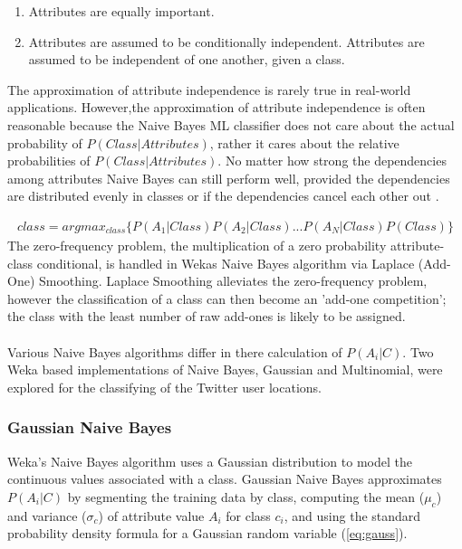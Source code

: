 \documentclass[11pt]{article}
\begin{document}
\begin{enumerate}
\item Attributes are equally important.
\item Attributes are assumed to be conditionally independent. Attributes are assumed to be independent of one another, given a class.
\end{enumerate}   
The approximation of attribute independence is rarely true in real-world applications. However,the approximation of attribute independence is often reasonable because the Naive Bayes ML classifier does not care about the actual probability of $P(Class|Attributes)$, rather it cares about the relative probabilities of $P(Class|Attributes)$. No matter how strong the dependencies among attributes Naive Bayes can still perform well, provided the dependencies are distributed evenly in classes or if the dependencies cancel each other out \cite{zhang-naive}. 

\begin{gather*}
class = argmax_{class}\{P(A_1|Class)P(A_2|Class)...P(A_N|Class)P(Class)\}
\tag{2}\label{eq:naive}
\end{gather*}
The zero-frequency problem, the multiplication of a zero probability attribute-class conditional, is handled in Wekas Naive Bayes algorithm via Laplace (Add-One) Smoothing. Laplace Smoothing alleviates the zero-frequency problem, however the classification of a class can then become an 'add-one competition'; the class with the least number of raw add-ones is likely to be assigned.\\\\
Various Naive Bayes algorithms differ in there calculation of $P(A_i|C)$. Two Weka based implementations of Naive Bayes, Gaussian and Multinomial, were explored for the classifying of the Twitter user locations.

\subsubsection{Gaussian Naive Bayes}

Weka's Naive Bayes algorithm uses a Gaussian distribution to model the continuous values associated with a class. Gaussian Naive Bayes approximates $P(A_i|C)$ by segmenting the training data by class, computing the mean ($\mu_c$) and variance ($\sigma_c$) of attribute value $A_i$ for class $c_i$, and using the standard probability density formula for a Gaussian random variable (\ref{eq:gauss}).
\end{document}
